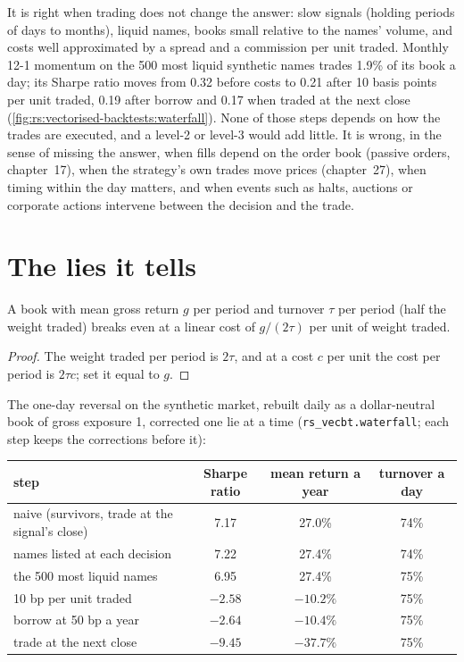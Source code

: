 It is right when trading does not change the answer: slow signals (holding periods of days to months), liquid names, books small relative
to the names' volume, and costs well approximated by a spread and a commission per unit traded. Monthly 12-1 momentum on the 500 most liquid
synthetic names trades 1.9\% of its book a day; its Sharpe ratio moves from 0.32 before costs to 0.21 after 10 basis points per unit traded,
0.19 after borrow and 0.17 when traded at the next close (\cref{fig:rs:vectorised-backtests:waterfall}). None of those steps depends on how the
trades are executed, and a level-2 or level-3  would add little. It is wrong, in the sense of missing the answer, when fills depend on the
order book (passive orders, chapter~17), when the strategy's own trades move prices (chapter~27), when timing within the day matters, and when
events such as halts, auctions or corporate actions intervene between the decision and the trade.

\section{The lies it tells}

\begin{proposition}\label{prop:rs:vectorised-backtests:breakeven}
A book with mean gross return $g$ per period and turnover $\tau$ per period (half the weight traded) breaks even at a linear cost of
$g/(2\tau)$ per unit of weight traded.
\end{proposition}

\begin{proof}
The weight traded per period is $2\tau$, and at a cost $c$ per unit the cost per period is $2\tau c$; set it equal to $g$.
\end{proof}

The one-day reversal on the synthetic market, rebuilt daily as a dollar-neutral book of gross exposure 1, corrected one lie at a time
(\texttt{rs\_vecbt.waterfall}; each step keeps the corrections before it):

\begin{center}
\small
\begin{tabular}{@{}lccc@{}}
\toprule
step & Sharpe ratio & mean return a year & turnover a day\\
\midrule
naive (survivors, trade at the signal's close) & 7.17 & 27.0\% & 74\%\\
names listed at each decision & 7.22 & 27.4\% & 74\%\\
the 500 most liquid names & 6.95 & 27.4\% & 75\%\\
10 bp per unit traded & $-2.58$ & $-10.2\%$ & 75\%\\
borrow at 50 bp a year & $-2.64$ & $-10.4\%$ & 75\%\\
trade at the next close & $-9.45$ & $-37.7\%$ & 75\%\\
\bottomrule
\end{tabular}
\end{center}

